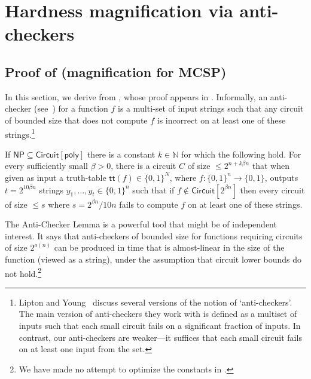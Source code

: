 \documentclass{toc}
\begin{document}
\section{Hardness magnification via anti-checkers}\label{s:magnification_mcsp}

\subsection{Proof of  (magnification for MCSP)} \label{ss:proof_of_main_thm}

In this section, we derive  from , whose proof appears in . Informally, an anti-checker (see~\cite{DBLP:conf/stoc/LiptonY94}) for a function $f$ is a multi-set of input strings such that any circuit of bounded size that does not compute $f$ is incorrect on at least one of these strings.\footnote{Lipton and Young~\cite{DBLP:conf/stoc/LiptonY94} discuss several versions of the notion of `anti-checkers'. The main version of anti-checkers they work with is defined as a multiset of inputs such that each small circuit fails on a significant fraction of inputs. In contrast, our anti-checkers are weaker---it suffices that each small circuit fails on at least one input from the set.}

\begin{lemma}\label{l:antichecker} If $\mathsf{NP} \subseteq \mathsf{Circuit}[\mathsf{poly}]$ there is a constant $k \in \mathbb{N}$ for which the following hold. For every sufficiently small $\beta > 0$, there is a circuit $C$ of size $\leq 2^{n + k\beta n}$ that when given as input a truth-table $\mathsf{tt}(f) \in \{0,1\}^N$, where $f \colon \{0,1\}^n \to \{0,1\}$, outputs $t = 2^{10 \beta n}$ strings $y_1, \ldots, y_t \in \{0,1\}^n$ such that if $f \notin \mathsf{Circuit}[2^{\beta n}]$ then every circuit of size $\leq s$ where $s = 2^{\beta n}/10n$ fails to compute $f$ on at least one of these strings.
\end{lemma}

The Anti-Checker Lemma is a powerful tool that might be of independent interest. It says that anti-checkers of bounded size for functions requiring circuits of size $2^{o(n)}$ can be produced in time that is almost-linear in the size of the function (viewed as a string), under the assumption that circuit lower bounds do not hold.\footnote{We have made no attempt to optimize the constants in .}
\end{document}
